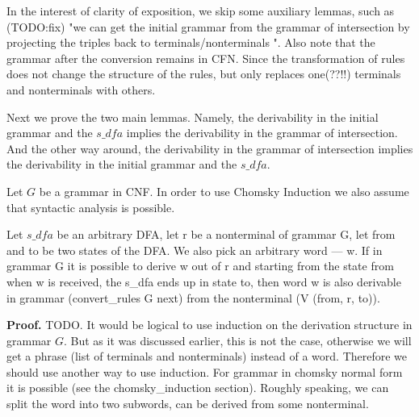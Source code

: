 In the interest of clarity of exposition, we skip some auxiliary lemmas, such as (TODO:fix) "we can get the initial grammar from the grammar of intersection by projecting the triples back to terminals/nonterminals ". Also note that the grammar after the conversion remains in CFN. Since the transformation of rules does not change the structure of the rules, but only replaces one(??!!) terminals and nonterminals with others.




Next we prove the two main lemmas. Namely, the derivability in the initial grammar and the $s\_dfa$ implies the derivability in the grammar of intersection. And the other way around, the derivability in the grammar of intersection implies the derivability in the initial grammar and the $s\_dfa$.

Let $G$ be a grammar in CNF. In order to use Chomsky Induction we also assume that syntactic analysis is possible. 


\begin{theorem}
    Let $s\_dfa$ be an arbitrary DFA, let r be a nonterminal of grammar G, let from and to be two states of the DFA. We also pick an arbitrary word --- w. If in grammar G it is possible to derive w out of r and starting from the state from when w is received, the s\_dfa ends up in state to, then word w is also derivable in grammar (convert\_rules G next) from the nonterminal (V (from, r, to)).
\end{theorem}
\textbf{Proof.} TODO.
It would be logical to use induction on the derivation structure in grammar $G$. But as it was discussed earlier, this is not the case, otherwise we will get a phrase (list of terminals and nonterminals) instead of a word. Therefore we should use another way to use induction. For grammar in chomsky 
normal form it is possible (see the chomsky\_induction section). Roughly speaking, we can split the word into two subwords,  can be derived from some nonterminal.

